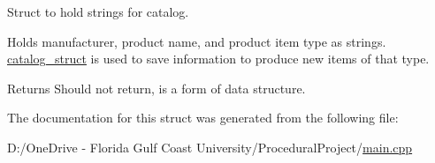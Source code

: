 Struct to hold strings for catalog.

Holds manufacturer, product name, and product item type as strings. \mbox{\hyperlink{structcatalog__struct}{catalog\+\_\+struct}} is used to save information to produce new items of that type.

\begin{DoxyReturn}{Returns}
Should not return, is a form of data structure. 
\end{DoxyReturn}


The documentation for this struct was generated from the following file\+:\begin{DoxyCompactItemize}
\item 
D\+:/\+One\+Drive -\/ Florida Gulf Coast University/\+Procedural\+Project/\mbox{\hyperlink{main_8cpp}{main.\+cpp}}\end{DoxyCompactItemize}
